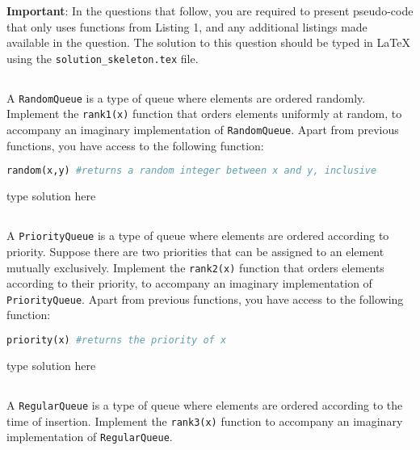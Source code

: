 \documentclass[addpoints]{exam}
\begin{document}
	
	\textbf{Important}: In the questions that follow, you are required to present pseudo-code that only uses functions from Listing 1, and any additional listings made available in the question. The solution to this question should be typed in LaTeX using the \texttt{solution\_skeleton.tex} file.
	
	\subsection{} A \texttt{RandomQueue} is a type of queue where elements are ordered randomly. Implement the \texttt{rank1(x)} function that orders elements uniformly at random, to accompany an imaginary implementation of \texttt{RandomQueue}. Apart from previous functions, you have access to the following function:
	\begin{lstlisting}[language=Python]
	random(x,y) #returns a random integer between x and y, inclusive\end{lstlisting}
	
	\begin{mdframed}
		type solution here
	\end{mdframed}
	
	\subsection{} A \texttt{PriorityQueue} is a type of queue where elements are ordered according to priority. Suppose there are two priorities that can be assigned to an element mutually exclusively. Implement the \texttt{rank2(x)} function that orders elements according to their priority, to accompany an imaginary implementation of \texttt{PriorityQueue}. Apart from previous functions, you have access to the following function:
	\begin{lstlisting}[language=Python]
	priority(x) #returns the priority of x\end{lstlisting}
	
	\begin{mdframed}
		type solution here
	\end{mdframed}
	
	\subsection{} A \texttt{RegularQueue} is a type of queue where elements are ordered according to the time of insertion. Implement the \texttt{rank3(x)} function to accompany an imaginary implementation of \texttt{RegularQueue}.
	
\end{document}
